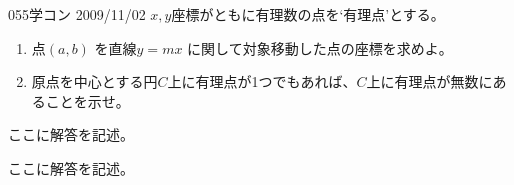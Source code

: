 \begin{thm}{055}{}{学コン 2009/11/02}
 $x,y$座標がともに有理数の点を`有理点'とする。
 \begin{enumerate}
  \item 点$(a,b)$ を直線$y=mx$ に関して対象移動した点の座標を求めよ。
  \item 原点を中心とする円$C$上に有理点が1つでもあれば、$C$上に有理点が無数にあることを示せ。
 \end{enumerate}
\end{thm}

ここに解答を記述。

ここに解答を記述。